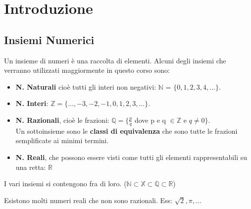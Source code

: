 \section{Introduzione}

\subsection{Insiemi Numerici}
Un insieme di numeri è una raccolta di elementi. Alcuni degli insiemi che verranno utilizzati maggiormente in questo corso sono:
\begin{itemize}
    \item \textbf{N. Naturali} cioè tutti gli interi non negativi: $\mathbb{N}$ = $\{0, 1, 2, 3, 4, ...\}$.
    \item \textbf{N. Interi}: $\mathbb{Z} = \{..., -3, -2, -1, 0, 1, 2, 3, ...\}$.
    \item \textbf{N. Razionali}, cioè le frazioni: $\mathbb{Q} = \{\frac{p}{q}$ dove p e q $\in \mathbb{Z}$ e $q \neq 0\}$. \\
    Un sottoinsieme sono le \textbf{classi di equivalenza} che sono tutte le frazioni semplificate ai minimi termini. 
    \item \textbf{N. Reali}, che possono essere visti come tutti gli elementi rappresentabili su una retta: $\mathbb{R}$ 
\end{itemize}
\begin{note}
I vari insiemi si contengono fra di loro. ($\mathbb{N} \subset \mathbb{X} \subset \mathbb{Q} \subset \mathbb{R}$) 
\end{note}
\begin{note}
Esistono molti numeri reali che non sono razionali. Ess: $\sqrt{2}, \pi, ...$
\end{note}

